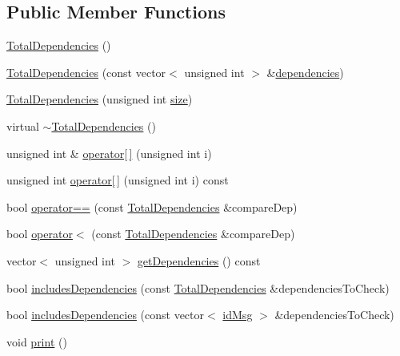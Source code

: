 \subsection*{Public Member Functions}
\begin{DoxyCompactItemize}
\item 
\hyperlink{classTotalDependencies_ae066781ee6df2248ee0091a094c1fc1b}{Total\+Dependencies} ()
\item 
\hyperlink{classTotalDependencies_a8bed75c4fa1477c1a5ca07df4c5191cd}{Total\+Dependencies} (const vector$<$ unsigned int $>$ \&\hyperlink{classTotalDependencies_a94825b4f782c30dfebf69dd2eba0bb1f}{dependencies})
\item 
\hyperlink{classTotalDependencies_a8623366d95adc8d1b4da4dee028acbd4}{Total\+Dependencies} (unsigned int \hyperlink{classTotalDependencies_a00ea27540cc51d5770d6013a21a41de2}{size})
\item 
virtual \hyperlink{classTotalDependencies_a960e7c1a6ca7a552cc36fb0bd1244d23}{$\sim$\+Total\+Dependencies} ()
\item 
unsigned int \& \hyperlink{classTotalDependencies_a3ec4e57f16606c11d6bd9de29a93c045}{operator\mbox{[}$\,$\mbox{]}} (unsigned int i)
\item 
unsigned int \hyperlink{classTotalDependencies_ad684b13fac0f7474fa68880ef9f5a30a}{operator\mbox{[}$\,$\mbox{]}} (unsigned int i) const
\item 
bool \hyperlink{classTotalDependencies_a8e3f326e355d9bb0364f160dcf0a4126}{operator==} (const \hyperlink{classTotalDependencies}{Total\+Dependencies} \&compare\+Dep)
\item 
bool \hyperlink{classTotalDependencies_ae5899d93bd269484c5ed6b5809d8d500}{operator$<$} (const \hyperlink{classTotalDependencies}{Total\+Dependencies} \&compare\+Dep)
\item 
vector$<$ unsigned int $>$ \hyperlink{classTotalDependencies_a43a89fb00be27b354a4df86f6c3c8b6e}{get\+Dependencies} () const
\item 
bool \hyperlink{classTotalDependencies_a66aebb100cbce0faf5551fd74b0de0d8}{includes\+Dependencies} (const \hyperlink{classTotalDependencies}{Total\+Dependencies} \&dependencies\+To\+Check)
\item 
bool \hyperlink{classTotalDependencies_aed1c3ce4bee031ca9341d8ce4a179ef0}{includes\+Dependencies} (const vector$<$ \hyperlink{structures_8h_a83a1d9a070efa5341da84cfd8e28d3e5}{id\+Msg} $>$ \&dependencies\+To\+Check)
\item 
void \hyperlink{classTotalDependencies_abd5c49f26000acb2c45d8b967922c7e7}{print} ()

\end{DoxyCompactItemize}
